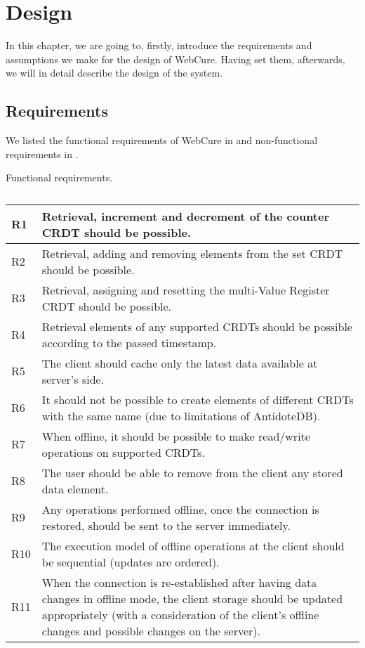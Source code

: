 \chapter{Design}
\label{Design}

In this chapter, we are going to, firstly, introduce the requirements and assumptions we make for the design of WebCure. Having set them, afterwards, we will in detail describe the design of the system.

\section{Requirements}
\label{4-Requirements}

We listed the functional requirements of WebCure in  and non-functional requirements in .

\begin{table}[!htbp]
\centering
\caption{Functional requirements.}
\label{table:req1}
\begin{tabular}{|p{1cm}|p{14cm}|}
\hline
R1 & Retrieval, increment and decrement of the counter CRDT should be possible.                         \\ \hline
R2 & Retrieval, adding and removing elements from the set CRDT should be possible.                       \\ \hline
R3 & Retrieval, assigning and resetting the multi-Value Register CRDT should be possible.               \\ \hline
R4 & Retrieval elements of any supported CRDTs should be possible according to the passed timestamp. \\ \hline
R5 & The client should cache only the latest data available at server's side. \\ \hline
R6 & It should not be possible to create elements of different CRDTs with the same name (due to limitations of AntidoteDB). \\ \hline
R7 & When offline, it should be possible to make read/write operations on supported CRDTs. \\ \hline
R8 & The user should be able to remove from the client any stored data element. \\ \hline
R9 & Any operations performed offline, once the connection is restored, should be sent to the server immediately. \\ \hline
R10 & The execution model of offline operations at the client should be sequential (updates are ordered). \\ \hline 
R11 & When the connection is re-established after having data changes in offline mode, the client storage should be updated appropriately (with a consideration of the client's offline changes and possible changes on the server). \\ \hline
\end{tabular}
\caption*{}
\end{table}

